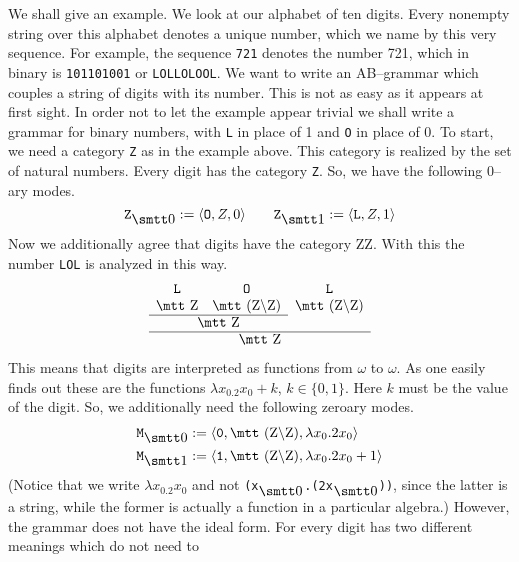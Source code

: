 We shall give an example. We look at our
alphabet of ten digits. Every nonempty string over this
alphabet denotes a unique number, which we name by this
very sequence. For example, the sequence {\tt 721} denotes
the number 721, which in binary is {\tt 101101001} or
{\tt LOLLOLOOL}. We want to write an AB--grammar which
couples a string of digits with its number.  This is not as easy
as it appears at first sight. In order not to let the example
appear trivial we shall write a grammar
for binary numbers, with {\tt L} in place of 1 and {\tt O}
in place of $0$. To start, we need a category
{\tt Z} as in the example above. This category is realized by the
set of natural numbers. Every digit has the category {\tt Z}.
So, we have the following 0--ary modes.
\begin{equation}
\mbox{\tt Z}_{\snull} := \auf \mbox{\tt O}, Z, 0\zu \qquad
\mbox{\tt Z}_{\seins} := \auf \mbox{\tt L}, Z, 1\zu 
\end{equation}
Now we additionally agree that digits have the category {\mtt
Z{\tb}Z}. With this the number {\tt LOL} is analyzed in this way.
\begin{equation}
\begin{array}{ccc}
\mbox{\tt L} & \mbox{\tt O} & \mbox{\tt L} \\
\mbox{\mtt Z} & \mbox{\mtt (Z{\tb}Z)} &
    \mbox{\mtt (Z{\tb}Z)} \\\cline{1-2}
    \multicolumn{2}{c}{\mbox{\mtt Z}} &
        \\\cline{1-3}
            \multicolumn{3}{c}{\mbox{\mtt Z}}
\end{array}
\end{equation}
This means that digits are interpreted as functions
from $\omega$ to $\omega$. As one easily finds out these are the
functions $\lambda x_0.2x_0+k$, $k \in \{0,1\}$. Here $k$ must be 
the value of the digit. So, we additionally need the following 
zeroary modes.
\begin{align}
\mbox{\tt M}_{\snull} & := \auf \mbox{\tt 0}, \mbox{\mtt (Z{\tb}Z)},
    \lambda x_0.2x_0\zu \\
\mbox{\tt M}_{\seins} & := \auf \mbox{\tt 1}, \mbox{\mtt (Z{\tb}Z)},
    \lambda x_0.2x_0+1\zu
\end{align}
(Notice that we write $\lambda x_0.2x_0$ and not 
\mbox{\tt (\stlambda x$_{\snull}$.(2{\mtt{}}x$_{\snull}$))}, 
since the latter is a string, while the former is actually a function 
in a particular algebra.) However, the grammar does not have the ideal form.
For every digit has two different meanings which do not need to
